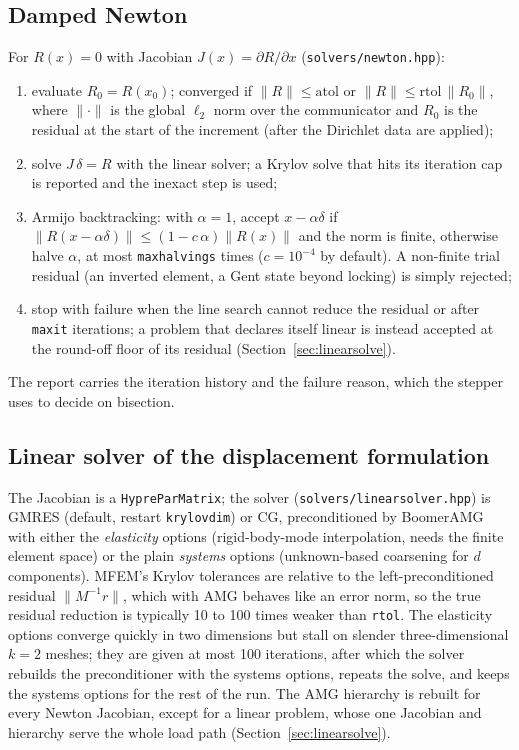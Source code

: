 \documentclass[11pt]{article}
\DeclareRobustCommand{\code}[1]{{\def\_{\textunderscore\allowbreak}\texttt{#1}}}
\DeclareRobustCommand{\file}[1]{{\def\_{\textunderscore\allowbreak}\texttt{#1}}}
\begin{document}
\subsection{Damped Newton}

For $R(x) = 0$ with Jacobian $J(x) = \partial R/\partial x$
(\file{solvers/newton.hpp}):
\begin{enumerate}[nosep]
  \item evaluate $R_0 = R(x_0)$; converged if $\|R\| \le \text{atol}$ or
    $\|R\| \le \text{rtol}\,\|R_0\|$, where $\|\cdot\|$ is the global
    $\ell_2$ norm over the communicator and $R_0$ is the residual at the
    start of the increment (after the Dirichlet data are applied);
  \item solve $J\,\delta = R$ with the linear solver; a Krylov solve that
    hits its iteration cap is reported and the inexact step is used;
  \item Armijo backtracking: with $\alpha = 1$, accept $x - \alpha\delta$
    if $\|R(x - \alpha\delta)\| \le (1 - c\,\alpha)\|R(x)\|$ and the norm is
    finite, otherwise halve $\alpha$, at most \code{max\_halvings} times
    ($c = 10^{-4}$ by default).  A non-finite trial residual (an inverted
    element, a Gent state beyond locking) is simply rejected;
  \item stop with failure when the line search cannot reduce the residual
    or after \code{max\_it} iterations; a problem that declares itself
    linear is instead accepted at the round-off floor of its residual
    (Section~\ref{sec:linearsolve}).
\end{enumerate}
The report carries the iteration history and the failure reason, which the
stepper uses to decide on bisection.

\subsection{Linear solver of the displacement formulation}

The Jacobian is a \code{HypreParMatrix}; the solver
(\file{solvers/linear\_solver.hpp}) is GMRES (default, restart
\code{krylov\_dim}) or CG, preconditioned by BoomerAMG with either the
\emph{elasticity} options (rigid-body-mode interpolation, needs the finite
element space) or the plain \emph{systems} options (unknown-based
coarsening for $d$ components).  MFEM's Krylov tolerances are relative to
the left-preconditioned residual $\|M^{-1}r\|$, which with AMG behaves like
an error norm, so the true residual reduction is typically 10 to 100 times
weaker than \code{rtol}.  The elasticity options converge quickly in two
dimensions but stall on slender three-dimensional $k = 2$ meshes; they are
given at most 100 iterations, after which the solver rebuilds the
preconditioner with the systems options, repeats the solve, and keeps the
systems options for the rest of the run.  The AMG hierarchy is rebuilt for
every Newton Jacobian, except for a linear problem, whose one Jacobian and
hierarchy serve the whole load path (Section~\ref{sec:linearsolve}).
\end{document}
